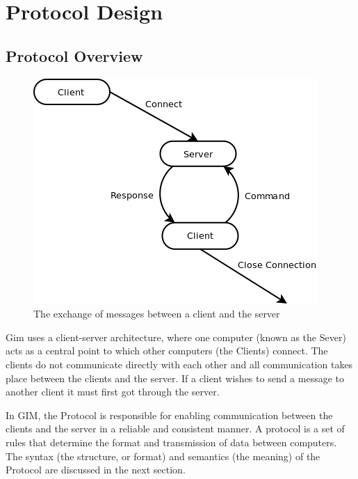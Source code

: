 \newcommand\SLASH{\char`\\}

\section{Protocol Design}


\subsection{Protocol Overview}

\begin{figure}[!h]
    \begin{center}
        \includegraphics[scale=0.65]{chapter2/diagrams/protocol_high_level.png}
        \caption{The exchange of messages between a client and the server}
        \label{highLevelDia}
    \end{center}
\end{figure}

Gim uses a client-server architecture, where one computer (known as the Sever) acts as a central point to which other computers (the Clients) connect. The clients do not communicate directly with each other and all communication takes place between the clients and the server. If a client wishes to send a message to another client it must first got through the server.

In GIM, the Protocol is responsible for enabling communication between the clients and the server in a reliable and consistent manner. A protocol is a set of rules that determine the format and transmission of data between computers. The syntax (the structure, or format) and semantics (the meaning) of the Protocol are discussed in the next section.

